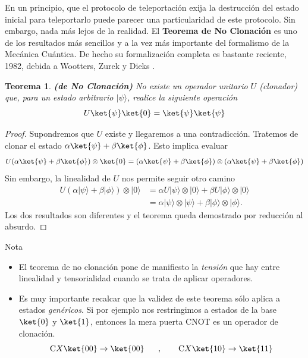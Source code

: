 \documentclass[a4paper,11pt]{book} %
\newtheorem{teorema_contador}{Teorema}
\newcommand{\Teorema}[1]{
		\begin{mybox_gray2}{}
			\begin{teorema_contador}
				 #1 
			\end{teorema_contador} 
		\end{mybox_gray2}
	}
\numberwithin{equation}{chapter}
\newcommand{\cg}[1]{{\rm C}#1}
\begin{document}
	En un principio, que el protocolo de teleportación exija la destrucción del estado inicial para teleportarlo puede parecer una particularidad de este protocolo. Sin embargo, nada más lejos de la realidad.
	El \textbf{Teorema de No Clonación} es uno de los resultados más sencillos y a la vez más importante del formalismo de la Mecánica Cuántica. De hecho su formalización completa es bastante reciente, 1982, debida a Wootters, Zurek \cite{clone2} y Dieks \cite{clone1}.
	
	\Teorema{ \textbf{(de No Clonación)} 
	No existe un operador unitario $U$ (clonador) que, para un estado arbitrario $|\psi\rangle$, realice la siguiente operación
		\begin{equation}
		U \ket{\psi}\ket{0} = \ket{\psi}\ket{\psi}
		\end{equation}}

	\begin{proof}
	Supondremos que $U$ existe y llegaremos a una contradicción. 
	Tratemos de clonar el estado $\alpha\ket{\psi}+\beta\ket{\phi}$. Esto implica evaluar
		\begin{equation*}
		U (\alpha\ket{\psi}+\beta\ket{\phi})\otimes \ket{0} = 	(\alpha\ket{\psi}+\beta\ket{\phi})\otimes (\alpha\ket{\psi}+\beta\ket{\phi})
		\end{equation*}	
	Sin embargo, la linealidad de $U$ nos permite seguir otro camino
		\begin{align*}
		U(\alpha|\psi\rangle+\beta|\phi\rangle) \otimes|0\rangle 
			& = \alpha U|\psi\rangle \otimes|0\rangle+\beta U|\phi\rangle \otimes|0\rangle  \\
			& = \alpha|\psi\rangle \otimes|\psi\rangle+\beta|\phi\rangle \otimes|\phi\rangle . 
		\end{align*}
	Los dos resultados son diferentes y el teorema queda demostrado por reducción al absurdo.
	\end{proof}


	\begin{mybox_blue}{Nota}
	\begin{itemize}
		\item El teorema de no clonación pone  de manifiesto la  \textit{tensión} que hay entre linealidad y tensorialidad cuando se trata de aplicar operadores.
		\item Es muy importante recalcar que la validez de este teorema sólo aplica a estados \textit{genéricos}. 
	Si por ejemplo nos restringimos a estados de la base $\ket{0}$ y $\ket{1}$, entonces la mera puerta CNOT es un operador de clonación.
    $$
	\cg{X}\ket{00}\to \ket{00}~~~~~,~~~~~~ \cg{X}\ket{10}\to \ket{11}
	$$
	\end{itemize}		 
	\end{mybox_blue}
\end{document}
